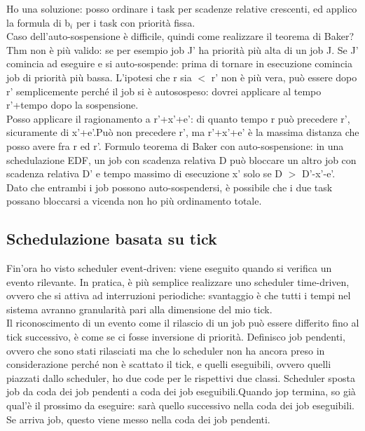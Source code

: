 \documentclass[12pt, oneside]{extbook}
\begin{document}
Ho una soluzione: posso ordinare i task per scadenze relative crescenti, ed applico la formula di b$_{i}$ per i task con priorità fissa.\\ Caso dell'auto-sospensione è difficile, quindi come realizzare il teorema di Baker? Thm non è più valido: se per esempio job J' ha priorità più alta di un job J. Se J' comincia ad eseguire e si auto-sospende: prima di tornare in esecuzione comincia job di priorità più bassa. L'ipotesi che r sia $<$ r' non è più vera, può essere dopo r' semplicemente perché il job si è autosospeso: dovrei applicare al tempo r'+tempo dopo la sospensione.\\ Posso applicare il ragionamento a r'+x'+e': di quanto tempo r può precedere r', sicuramente di x'+e'.Può non precedere r', ma r'+x'+e' è la massima distanza che posso avere fra r ed r'. Formulo teorema di Baker con auto-sospensione: in una schedulazione EDF, un job con scadenza relativa D può bloccare un altro job con scadenza relativa D' e tempo massimo di esecuzione x' solo se D $>$ D'-x'-e'.\\ Dato che entrambi i job possono auto-sospendersi, è possibile che i due task possano bloccarsi a vicenda non ho più ordinamento totale.
\subsection{Schedulazione basata su tick}
Fin'ora ho visto scheduler event-driven: viene eseguito quando si verifica un evento rilevante. In pratica, è più semplice realizzare uno scheduler time-driven, ovvero che si attiva ad interruzioni periodiche: svantaggio è che tutti i tempi nel sistema avranno granularità pari alla dimensione del mio tick.\\ Il riconoscimento di un evento come il rilascio di un job può essere differito fino al tick successivo, è come se ci fosse inversione di priorità. Definisco job pendenti, ovvero che sono stati rilasciati ma che lo scheduler non ha ancora preso in considerazione perché non è scattato il tick, e quelli eseguibili, ovvero quelli piazzati dallo scheduler, ho due code per le rispettivi due classi. Scheduler sposta job da coda dei job pendenti a coda dei job eseguibili.Quando jop termina, so già qual'è il prossimo da eseguire: sarà quello successivo nella coda dei job eseguibili. Se arriva job, questo viene messo nella coda dei job pendenti.
\end{document}
